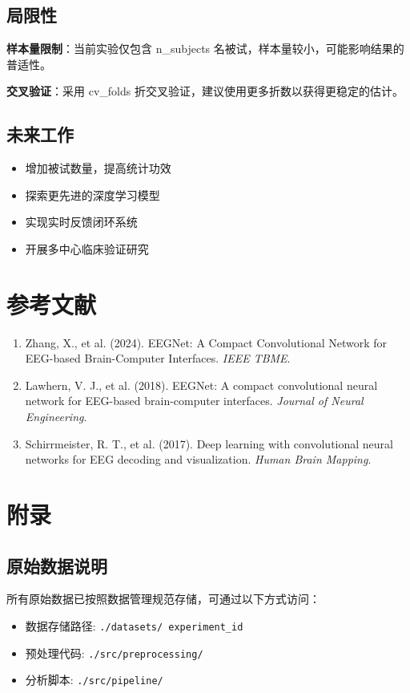 \documentclass[12pt,a4paper]{article}
\begin{document}
{{{{{{{{{\subsection{局限性}
{%
\textbf{样本量限制}：当前实验仅包含{{ n_subjects }}名被试，样本量较小，可能影响结果的普适性。
{%

{%
\textbf{交叉验证}：采用{{ cv_folds }}折交叉验证，建议使用更多折数以获得更稳定的估计。
{%

\subsection{未来工作}
\begin{itemize}
    \item 增加被试数量，提高统计功效
    \item 探索更先进的深度学习模型
    \item 实现实时反馈闭环系统
    \item 开展多中心临床验证研究
\end{itemize}

\section*{参考文献}
\begin{enumerate}
    \item Zhang, X., et al. (2024). EEGNet: A Compact Convolutional Network for EEG-based Brain-Computer Interfaces. \textit{IEEE TBME}.
    \item Lawhern, V. J., et al. (2018). EEGNet: A compact convolutional neural network for EEG-based brain-computer interfaces. \textit{Journal of Neural Engineering}.
    \item Schirrmeister, R. T., et al. (2017). Deep learning with convolutional neural networks for EEG decoding and visualization. \textit{Human Brain Mapping}.
\end{enumerate}

\section*{附录}
\subsection{原始数据说明}
所有原始数据已按照数据管理规范存储，可通过以下方式访问：
\begin{itemize}
    \item 数据存储路径: \texttt{./datasets/{{ experiment_id }}}
    \item 预处理代码: \texttt{./src/preprocessing/}
    \item 分析脚本: \texttt{./src/pipeline/}
\end{itemize}

}}}}}}}}}}}}}
\end{document}
